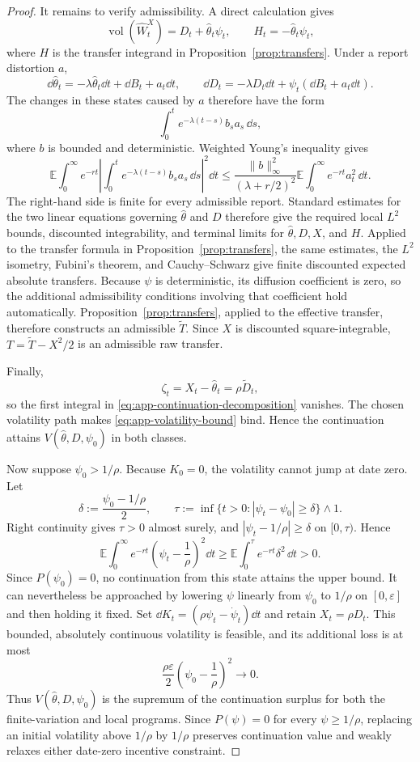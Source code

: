 \documentclass[12pt]{article}
\DeclareMathOperator{\vol}{vol}
\newcommand{\E}{\mathbb{E}}
\newcommand{\hth}{\hat\theta}
\begin{document}
\begin{proof}
It remains to verify admissibility. A direct
calculation gives
\[
  \vol(\widehat W_t^X)=D_t+\hth_t\psi_t,
  \qquad
  H_t=-\hth_t\psi_t,
\]
where \(H\) is the transfer integrand in
Proposition~\ref{prop:transfers}. Under a report distortion \(a\),
\[
  \dd\hth_t=-\lambda\hth_t\dd t+\dd B_t+a_t\dd t,
  \qquad
  \dd D_t=-\lambda D_t\dd t+\psi_t(\dd B_t+a_t\dd t).
\]
The changes in these states caused by \(a\) therefore have the form
\[
  \int_0^t e^{-\lambda(t-s)}b_sa_s\,\dd s,
\]
where \(b\) is bounded and deterministic. Weighted Young's inequality gives
\[
  \E\int_0^\infty e^{-rt}
  \left|\int_0^t e^{-\lambda(t-s)}b_sa_s\,\dd s\right|^2\dd t
  \leq
  \frac{\|b\|_\infty^2}{(\lambda+r/2)^2}
  \E\int_0^\infty e^{-rt}a_t^2\,\dd t.
\]
The right-hand side is finite for every admissible report. Standard
estimates for the two linear equations governing \(\hth\) and \(D\) therefore give the required local
\(L^2\) bounds, discounted integrability, and terminal limits for
\(\hth,D,X\), and \(H\). Applied to the transfer formula in
Proposition~\ref{prop:transfers}, the same estimates, the \(L^2\) isometry,
Fubini's theorem, and Cauchy--Schwarz give finite discounted expected
absolute transfers. Because \(\psi\) is deterministic, its diffusion
coefficient is zero, so the additional admissibility conditions involving
that coefficient hold automatically. Proposition~\ref{prop:transfers},
applied to the effective transfer, therefore constructs an admissible
\(\widetilde T\). Since \(X\) is discounted square-integrable,
\(T=\widetilde T-X^2/2\) is an admissible raw transfer.

Finally,
\[
  \zeta_t=X_t-\hth_t=\rho\widetilde D_t,
\]
so the first integral in
\eqref{eq:app-continuation-decomposition} vanishes. The chosen volatility
path makes \eqref{eq:app-volatility-bound} bind. Hence the continuation
attains \(V(\hth,D,\psi_0)\) in both classes.

Now suppose \(\psi_0>1/\rho\). Because \(K_0=0\), the volatility cannot
jump at date zero. Let
\[
  \delta:=\frac{\psi_0-1/\rho}{2},
  \qquad
  \tau:=\inf\{t>0:|\psi_t-\psi_0|\geq\delta\}\wedge1.
\]
Right continuity gives \(\tau>0\) almost surely, and
\(|\psi_t-1/\rho|\geq\delta\) on \([0,\tau)\). Hence
\[
  \E\int_0^\infty e^{-rt}
    \left(\psi_t-\frac1\rho\right)^2\dd t
  \geq
  \E\int_0^\tau e^{-rt}\delta^2\,\dd t
  >0.
\]
Since \(P(\psi_0)=0\), no continuation from this state attains the upper
bound. It can nevertheless be approached by lowering \(\psi\) linearly
from \(\psi_0\) to \(1/\rho\) on \([0,\varepsilon]\) and then
holding it fixed. Set \(\dd K_t=(\rho\psi_t-\dot\psi_t)\dd t\)
and retain \(X_t=\rho D_t\). This bounded, absolutely continuous
volatility is feasible, and its additional loss is at most
\[
  \frac{\rho\varepsilon}{2}
  \left(\psi_0-\frac1\rho\right)^2\longrightarrow0.
\]
Thus \(V(\hth,D,\psi_0)\) is the supremum of the continuation surplus for both the finite-variation and local programs. Since
\(P(\psi)=0\) for every \(\psi\geq1/\rho\), replacing an initial
volatility above \(1/\rho\) by \(1/\rho\) preserves continuation value
and weakly relaxes either date-zero incentive constraint.


\end{proof}
\end{document}
